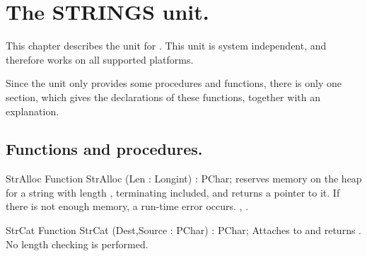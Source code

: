 %
%
%
%
%
\chapter{The STRINGS unit.}
\label{ch:strings}

This chapter describes the  unit for \fpc. This unit is system
independent, and therefore works on all supported platforms.

Since the unit only provides some procedures and functions, there is
only one section, which gives the declarations of these functions, together
with an explanation. 

\section{Functions and procedures.}

\begin{function}{StrAlloc}
\Declaration
Function StrAlloc (Len : Longint) : PChar;
\Description
{} reserves memory on the heap for a string with length ,
terminating  included, and returns a pointer to it.
\Errors
If there is not enough memory, a run-time error occurs.
\SeeAlso
{}, .
\end{function}


\begin{function}{StrCat}
\Declaration
Function StrCat (Dest,Source : PChar) : PChar;
\Description
Attaches  to  and returns .
\Errors
No length checking is performed.
\SeeAlso
{}
\end{function}

